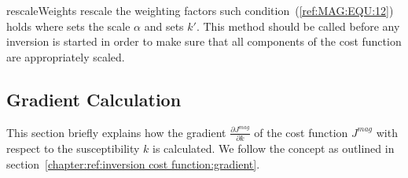 \begin{methoddesc}[MagneticModel]{rescaleWeights}{
 }
rescale the weighting factors such condition~(\ref{ref:MAG:EQU:12}) holds where 
 sets the scale $\alpha$
and  sets $k'$. This method should be called before any inversion is started
in order to make sure that all components of the cost function are appropriately scaled.
\end{methoddesc}


\subsection{Gradient Calculation}
This section briefly explains how the gradient
$\frac{\partial J^{mag}}{\partial k}$ of the cost function $J^{mag}$ with
respect to the susceptibility $k$ is calculated.  We follow the concept as outlined in section~\ref{chapter:ref:inversion cost function:gradient}.

